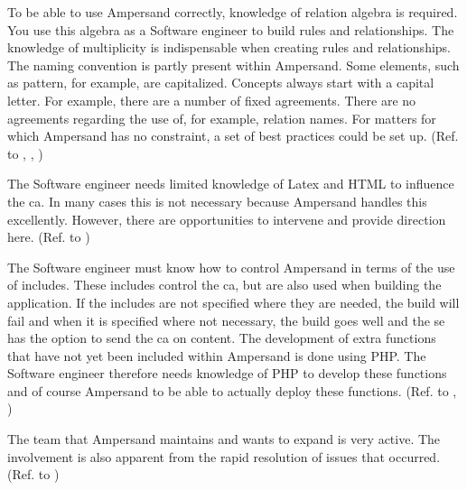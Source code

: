 To be able to use Ampersand correctly, knowledge of relation algebra is required.
You use this algebra as a Software engineer to build rules and relationships.
The knowledge of multiplicity is indispensable when creating rules and relationships.
The naming convention is partly present within Ampersand.
Some elements, such as pattern, for example, are capitalized.
Concepts always start with a capital letter.
For example, there are a number of fixed agreements.
There are no agreements regarding the use of, for example, relation names.
For matters for which Ampersand has no constraint, a set of best practices could be set up.
(Ref. to , , )


The Software engineer needs limited knowledge of Latex and HTML to influence the \acrshort{ca}.
In many cases this is not necessary because Ampersand handles this excellently.
However, there are opportunities to intervene and provide direction here.
(Ref. to )


The Software engineer must know how to control Ampersand in terms of the use of includes.
These includes control the \acrshort{ca}, but are also used when building the application.
If the includes are not specified where they are needed, the build will fail and when it is specified where not necessary, the build goes well and the \acrshort{se} has the option to send the \acrshort{ca} on content.
The development of extra functions that have not yet been included within Ampersand is done using PHP.
The Software engineer therefore needs knowledge of PHP to develop these functions and of course Ampersand to be able to actually deploy these functions.
(Ref. to ,  )


The team that Ampersand maintains and wants to expand is very active.
The involvement is also apparent from the rapid resolution of issues that occurred.
(Ref. to )


